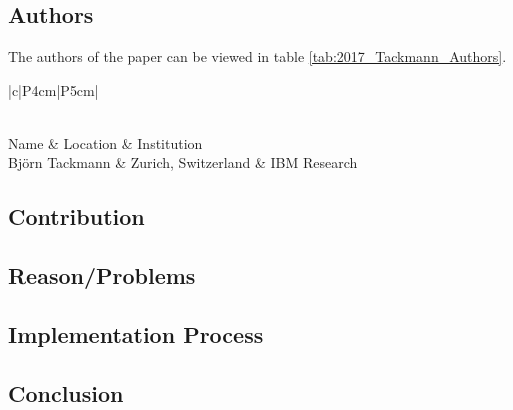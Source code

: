 \clearpage
\section*{\citet{2017_Tackmann}}

\subsection*{Authors}
The authors of the paper can be viewed in table \ref{tab:2017_Tackmann_Authors}.
\begin{longtable}{ |c|P{4cm}|P{5cm}| }
	\caption{Authors} \label{tab:2017_Tackmann_Authors} \\
	\hline
 	Name & Location & Institution \\ [0.5ex] 
 	\hline\hline
 	\endhead
 	Björn Tackmann & Zurich, Switzerland  & IBM Research  \\
	 \hline
\end{longtable}


\subsection*{Contribution}



\subsection*{Reason/Problems}



\subsection*{Implementation Process}


\subsection*{Conclusion}

